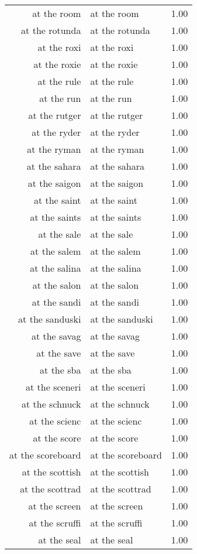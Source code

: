 \begin{table}[ht]
\begin{tabular}{rlr}
  at the room & at the room & 1.00 \\ 
  at the rotunda & at the rotunda & 1.00 \\ 
  at the roxi & at the roxi & 1.00 \\ 
  at the roxie & at the roxie & 1.00 \\ 
  at the rule & at the rule & 1.00 \\ 
  at the run & at the run & 1.00 \\ 
  at the rutger & at the rutger & 1.00 \\ 
  at the ryder & at the ryder & 1.00 \\ 
  at the ryman & at the ryman & 1.00 \\ 
  at the sahara & at the sahara & 1.00 \\ 
  at the saigon & at the saigon & 1.00 \\ 
  at the saint & at the saint & 1.00 \\ 
  at the saints & at the saints & 1.00 \\ 
  at the sale & at the sale & 1.00 \\ 
  at the salem & at the salem & 1.00 \\ 
  at the salina & at the salina & 1.00 \\ 
  at the salon & at the salon & 1.00 \\ 
  at the sandi & at the sandi & 1.00 \\ 
  at the sanduski & at the sanduski & 1.00 \\ 
  at the savag & at the savag & 1.00 \\ 
  at the save & at the save & 1.00 \\ 
  at the sba & at the sba & 1.00 \\ 
  at the sceneri & at the sceneri & 1.00 \\ 
  at the schnuck & at the schnuck & 1.00 \\ 
  at the scienc & at the scienc & 1.00 \\ 
  at the score & at the score & 1.00 \\ 
  at the scoreboard & at the scoreboard & 1.00 \\ 
  at the scottish & at the scottish & 1.00 \\ 
  at the scottrad & at the scottrad & 1.00 \\ 
  at the screen & at the screen & 1.00 \\ 
  at the scruffi & at the scruffi & 1.00 \\ 
  at the seal & at the seal & 1.00 \\ 

\end{tabular}
\end{table}
